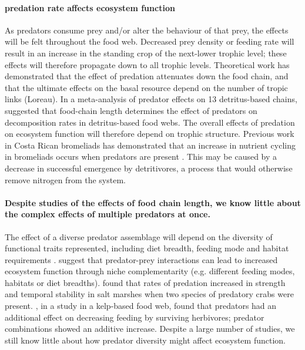 \documentclass[10pt]{article}
\begin{document}
\begin{spacing}{2}
\paragraph{predation rate affects ecosystem function} As predators
consume prey and/or alter the behaviour of that prey, the effects will
be felt throughout the food web.  Decreased prey density or feeding
rate will result in an increase in the standing crop of the next-lower
trophic level; these effects will therefore propagate down to all
trophic levels.  Theoretical work has demonstrated that the effect of
predation attenuates down the food chain, and that the ultimate
effects on the basal resource depend on the number of tropic links
(Loreau). In a meta-analysis of predator effects on 13 detritus-based
chains, \citet{Schmitz2007} suggested that food-chain length
determines the effect of predators on decomposition rates in
detritus-based food webs. The overall effects of predation on ecosystem
function will therefore depend on trophic structure. Previous work in
Costa Rican bromeliads has demonstrated that an increase in nutrient
cycling in bromeliads occurs when predators are present
\citep{Ngai2006}.  This may be caused by a decrease in successful
emergence by detritivores, a process that would otherwise remove
nitrogen from the system.

\paragraph{Despite studies of the effects of food chain length, we know little
about the complex effects of multiple predators at once.}%
The effect of a diverse predator assemblage will depend on the
diversity of functional traits represented, including diet breadth,
feeding mode and habitat requirements
\citep{Schmitz2009}. \citet{Ives2005} suggest that predator-prey
interactions can lead to increased ecosystem function through niche
complementarity (e.g. different feeding modes, habitats or diet
breadths). \citet{Griffin2011} found that rates of predation increased
in strength and temporal stability in salt marshes when two species of
predatory crabs were present. \citet{Byrnes2006}, in a study in a
kelp-based food web, found that predators had an additional effect on
decreasing feeding by surviving herbivores; predator combinations
showed an additive increase.  Despite a large number of studies, we
still know little about how predator diversity might affect ecosystem
function.


\end{spacing}
\end{document}

